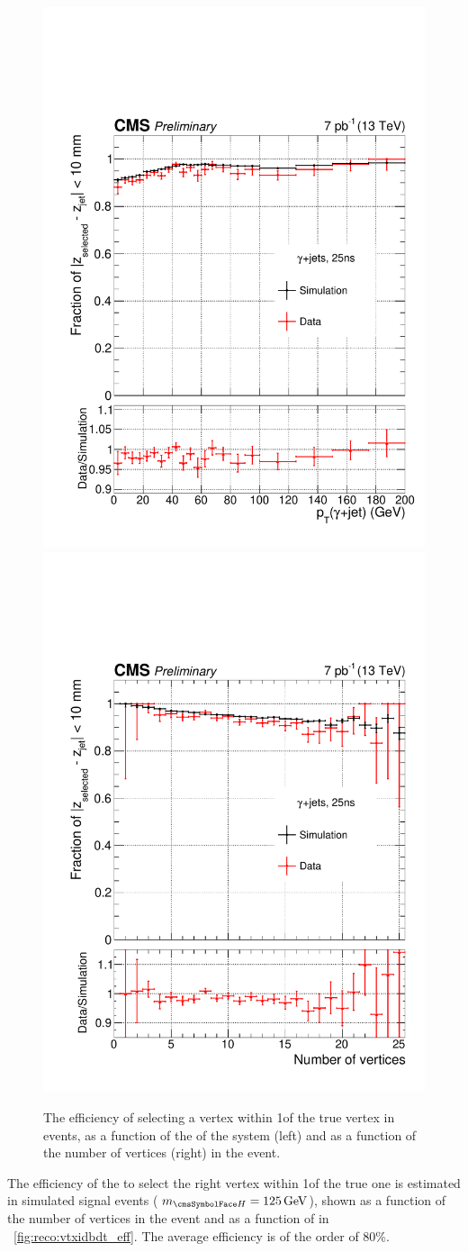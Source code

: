 \begin{figure}
\begin{center}
\includegraphics[width=0.45\linewidth]{recoFigures/last_gamma_jets_eff_vs_pT.pdf}
\includegraphics[width=0.45\linewidth]{recoFigures/last_gamma_jets_nVtx.pdf}
\caption{The efficiency of selecting a vertex within 1\cm of the true vertex in \gammaJet events, as a function of the \pT of the \gammaJet system (left) and as a function of the number of vertices (right) in the event.}
\label{fig:reco:vtx_if_eff_gjet_validation}
\end{center}
\end{figure}


The efficiency of the \VtxIdBdt to select the right vertex within 1\cm of the true one is estimated in simulated signal events ($\mH=125\GeV$), shown as a function of the number of vertices in the event and as a function of \pT in \Fig~\ref{fig:reco:vtxidbdt_eff}. The average efficiency is of the order of 80\%. 

